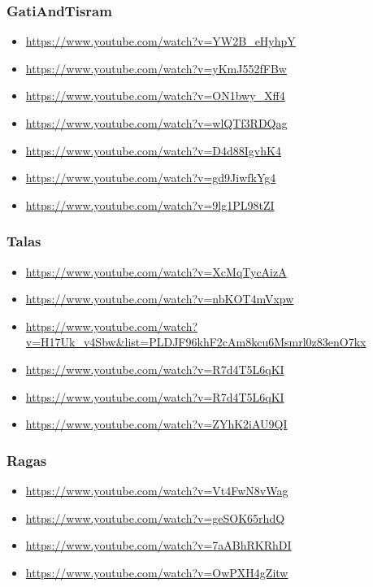 \subsubsection{GatiAndTisram}
\label{sec:org3d32638}
\begin{itemize}
\item \url{https://www.youtube.com/watch?v=YW2B\_eHyhpY}
\item \url{https://www.youtube.com/watch?v=yKmJ552fFBw}
\item \url{https://www.youtube.com/watch?v=ON1bwy\_Xff4}
\item \url{https://www.youtube.com/watch?v=wlQTf3RDQag}
\item \url{https://www.youtube.com/watch?v=D4d88IgvhK4}
\item \url{https://www.youtube.com/watch?v=gd9JiwfkYg4}
\item \url{https://www.youtube.com/watch?v=9lg1PL98tZI}
\end{itemize}

\subsubsection{Talas}
\label{sec:org1c67479}
\begin{itemize}
\item \url{https://www.youtube.com/watch?v=XcMqTycAizA}
\item \url{https://www.youtube.com/watch?v=nbKOT4mVxpw}
\item \url{https://www.youtube.com/watch?v=H17Uk\_v4Sbw\&list=PLDJF96khF2cAm8kcu6Msmrl0z83enO7kx}
\item \url{https://www.youtube.com/watch?v=R7d4T5L6qKI}
\item \url{https://www.youtube.com/watch?v=R7d4T5L6qKI}
\item \url{https://www.youtube.com/watch?v=ZYhK2iAU9QI}
\end{itemize}

\subsubsection{Ragas}
\label{sec:org3ded872}
\begin{itemize}
\item \url{https://www.youtube.com/watch?v=Vt4FwN8vWag}
\item \url{https://www.youtube.com/watch?v=geSOK65rhdQ}
\item \url{https://www.youtube.com/watch?v=7aABhRKRhDI}
\item \url{https://www.youtube.com/watch?v=OwPXH4gZitw}
\end{itemize}

